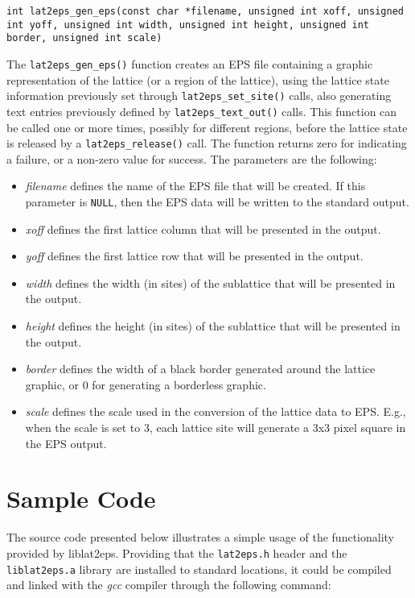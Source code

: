\documentclass[a4paper]{article}
\begin{document}
\texttt{int lat2eps\_gen\_eps(const char *filename, unsigned int xoff, unsigned int yoff, unsigned int width, unsigned int height, unsigned int border, unsigned int scale)}
\bigbreak

The \texttt{lat2eps\_gen\_eps()} function creates an EPS file containing a graphic representation of the lattice (or a region of the lattice), using the lattice state information previously set through \texttt{lat2eps\_set\_site()} calls, also generating text entries previously defined by \texttt{lat2eps\_text\_out()} calls. This function can be called one or more times, possibly for different regions, before the lattice state is released by a \texttt{lat2eps\_release()} call. The function returns zero for indicating a failure, or a non-zero value for success. The parameters are the following:

\begin{itemize}
  \item \textit{filename} defines the name of the EPS file that will be created. If this parameter is \texttt{NULL}, then the EPS data will be written to the standard output.
  \item \textit{xoff} defines the first lattice column that will be presented in the output.
  \item \textit{yoff} defines the first lattice row that will be presented in the output.
  \item \textit{width} defines the width (in sites) of the sublattice that will be presented in the output.
  \item \textit{height} defines the height (in sites) of the sublattice that will be presented in the output.
  \item \textit{border} defines the width of a black border generated around the lattice graphic, or 0 for generating a borderless graphic.
  \item \textit{scale} defines the scale used in the conversion of the lattice data to EPS. E.g., when the scale is set to 3, each lattice site will generate a 3x3 pixel square in the EPS output.
\end{itemize} 
\bigbreak\bigbreak
\newpage

\section{Sample Code}

The source code presented below illustrates a simple usage of the functionality provided by liblat2eps. Providing that the \texttt{lat2eps.h} header and the \texttt{liblat2eps.a} library are installed to standard locations, it could be compiled and linked with the \textit{gcc} compiler through the following command:
\bigbreak
\end{document}
